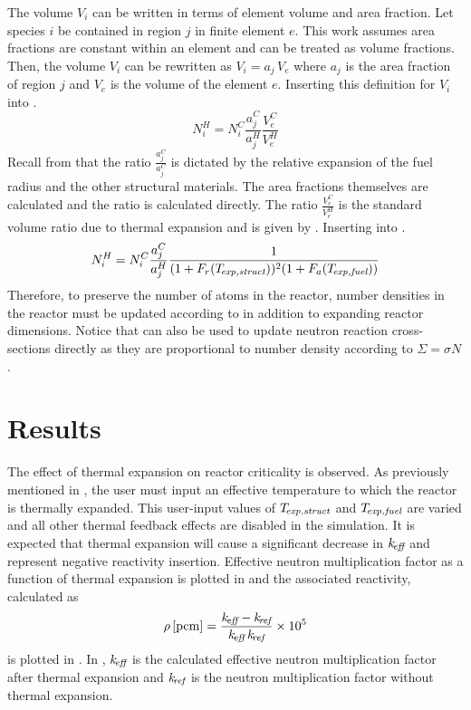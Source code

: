     The volume $V_i$ can be written in terms of element volume and area
    fraction. Let species $i$ be contained in region $j$ in finite element $e$. 
    This work assumes area fractions are constant within an element and can be
    treated as volume fractions. Then, the volume $V_i$ can be rewritten as 
    $V_i = a_j \, V_e$ where $a_j$ is the area fraction of region $j$ and $V_e$
    is the volume of the element $e$. Inserting this definition for $V_i$ into
    .
    \begin{equation}
      \label{eq:nden_expansion_expanded}
      N_i^H = N_i^C \frac{a_j^C}{a_j^H} \frac{V_e^C}{V_e^H}
    \end{equation}
    Recall from  that the
    ratio $\frac{a_j^C}{a_j^C}$ is dictated by the relative expansion of the
    fuel radius and the other structural materials. The area fractions
    themselves are calculated and the ratio is calculated directly. The 
    ratio $\frac{V_e^C}{V_e^H}$ is the standard volume ratio due to thermal 
    expansion and is given by . Inserting 
     into .
    \begin{equation}
      \label{eq:nden_thexp_update}
      N_i^H = N_i^C \frac{a_j^C}{a_j^H} 
        \frac{1}{(1+F_r(T_{\!\mbox{\scriptsize \em exp,struct}}))^2 (1+F_a({T_{\!\mbox{\scriptsize \em exp,fuel}}}))}
    \end{equation}
    Therefore, to preserve the number of atoms in the reactor, number densities
    in the reactor must be updated according to  in
    addition to expanding reactor dimensions. Notice that
     can also be used to update neutron reaction 
    cross-sections directly as they are proportional to number density according
    to $\Sigma = \sigma N$.

\section{Results}
  The effect of thermal expansion on reactor criticality is observed. As
  previously mentioned in , 
  the user must input an effective temperature to which the reactor is thermally 
  expanded. This user-input values of $T_{\!\mbox{\scriptsize \em exp,struct}}$ and ${T_{\!\mbox{\scriptsize \em exp,fuel}}}$ are varied 
  and all other thermal feedback effects are disabled in the simulation. It is 
  expected that thermal expansion will cause a significant decrease in $k_{\!\mbox{\scriptsize \em eff}}$ 
  and represent negative reactivity insertion. Effective neutron multiplication 
  factor as a function of thermal expansion is plotted in  
  and the associated reactivity, calculated as
  \begin{equation}
    \label{eq:reactivity_formula}
    \rho \left[\text{{pcm}}\right] = \frac{k_{\!\mbox{\scriptsize \em eff}} - k_{\!\mbox{\scriptsize \em ref}}}{k_{\!\mbox{\scriptsize \em eff}} \, k_{\!\mbox{\scriptsize \em ref}}} \times 10^5
  \end{equation}
  is plotted in . In
  , $k_{\!\mbox{\scriptsize \em eff}}$ is the calculated effective neutron 
  multiplication factor after thermal expansion and $k_{\!\mbox{\scriptsize \em ref}}$ is the neutron 
  multiplication factor without thermal expansion. 

